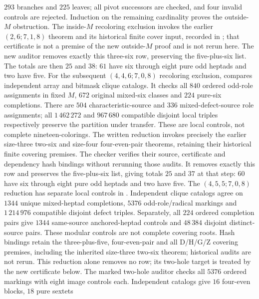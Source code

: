 $293$ branches and $225$ leaves; all pivot successors are checked,
and four invalid controls are rejected. Induction on the remaining
cardinality proves the outside-$M$ obstruction. The inside-$M$
recoloring exclusion invokes the earlier $(2,6;7,1,8)$ theorem and
its historical finite cover input, recorded in
; that certificate is
not a premise of the new outside-$M$ proof and is not rerun here.
The new auditor removes exactly this three-six row, preserving
the five-plus-six list. The totals are then $25$ and $38$:
$61$ have six through eight pure odd heptads and two have five.
For the subsequent $(4,4,6;7,0,8)$ recoloring exclusion,
compares independent array and bitmask clique catalogs. It checks
all $840$ ordered odd-role assignments in fixed $M$, $672$ original
mixed-six classes and $224$ pure-six completions. There are
$504$ characteristic-source and $336$ mixed-defect-source role
assignments; all $1\,462\,272$ and $967\,680$ compatible disjoint
local triples respectively preserve the partition under transfer.
These are local controls, not complete nineteen-colorings.
The written reduction invokes precisely the earlier size-three
two-six and size-four four-even-pair theorems, retaining their
historical finite covering premises. The checker verifies their
source, certificate and dependency hash bindings without rerunning
those audits. It removes exactly this row and preserves the
five-plus-six list, giving totals $25$ and $37$ at that step: $60$
have six through eight pure odd heptads and two have five.
The $(4,5,5;7,0,8)$ reduction has separate local controls in
.
Independent clique catalogs agree on $1344$ unique mixed-heptad
completions, $5376$ odd-role/radical markings and $1\,214\,976$
compatible disjoint defect triples. Separately, all $224$ ordered
completion pairs give $1344$ same-source anchored-heptad controls
and $48\,384$ disjoint distinct-source pairs. These modular
controls are not complete covering roots. Hash bindings retain
the three-plus-five, four-even-pair and all D/H/G/Z covering
premises, including the inherited size-three two-six theorem;
historical audits are not rerun. This reduction alone removes
no row; its two-hole target is treated by the new certificate below.
The marked two-hole auditor
checks all $5376$ ordered markings with eight image controls each.
Independent catalogs give $16$ four-even blocks, $18$ pure sextets
